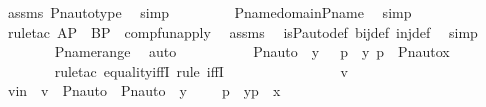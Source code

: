 \begin{isabellebody}
\ assms\ Pn{\isacharunderscore}{\kern0pt}auto{\isacharunderscore}{\kern0pt}type\ \isamarkupfalse%
\ simp\ \isanewline
\ \ \ \ \ \ \isamarkupfalse%
\ P{\isacharunderscore}{\kern0pt}name{\isacharunderscore}{\kern0pt}domain{\isacharunderscore}{\kern0pt}P{\isacharunderscore}{\kern0pt}name\ \isamarkupfalse%
\ simp\ \isanewline
\ \ \ \ \ \ \isamarkupfalse%
\ {\isacharparenleft}{\kern0pt}rule{\isacharunderscore}{\kern0pt}tac\ A{\isacharequal}{\kern0pt}P\ \ B{\isacharequal}{\kern0pt}P\ \ comp{\isacharunderscore}{\kern0pt}fun{\isacharunderscore}{\kern0pt}apply{\isacharparenright}{\kern0pt}\ \isamarkupfalse%
\ assms\ \isamarkupfalse%
\ is{\isacharunderscore}{\kern0pt}P{\isacharunderscore}{\kern0pt}auto{\isacharunderscore}{\kern0pt}def\ bij{\isacharunderscore}{\kern0pt}def\ inj{\isacharunderscore}{\kern0pt}def\ \isamarkupfalse%
\ simp\ \isanewline
\ \ \ \ \ \ \isamarkupfalse%
\ P{\isacharunderscore}{\kern0pt}name{\isacharunderscore}{\kern0pt}range\ \isamarkupfalse%
\ auto\isanewline
\ \ \ \ \isamarkupfalse%
\ \isamarkupfalse%
\ {\isachardoublequoteopen}{\isachardot}{\kern0pt}{\isachardot}{\kern0pt}{\isachardot}{\kern0pt}\ {\isacharequal}{\kern0pt}\ {\isacharbraceleft}{\kern0pt}\ {\isacharless}{\kern0pt}Pn{\isacharunderscore}{\kern0pt}auto{\isacharparenleft}{\kern0pt}{\isasympi}{\isacharparenright}{\kern0pt}\ {\isacharbackquote}{\kern0pt}\ y{\isacharprime}{\kern0pt}{\isacharcomma}{\kern0pt}\ {\isasympi}\ {\isacharbackquote}{\kern0pt}\ p{\isacharprime}{\kern0pt}{\isachargreater}{\kern0pt}\ {\isachardot}{\kern0pt}\ {\isacharless}{\kern0pt}y{\isacharprime}{\kern0pt}{\isacharcomma}{\kern0pt}\ p{\isacharprime}{\kern0pt}{\isachargreater}{\kern0pt}\ {\isasymin}\ Pn{\isacharunderscore}{\kern0pt}auto{\isacharparenleft}{\kern0pt}{\isasymtau}{\isacharparenright}{\kern0pt}{\isacharbackquote}{\kern0pt}x\ {\isacharbraceright}{\kern0pt}{\isachardoublequoteclose}\ \isanewline
\ \ \ \ \ \ \isamarkupfalse%
\ {\isacharparenleft}{\kern0pt}rule{\isacharunderscore}{\kern0pt}tac\ equality{\isacharunderscore}{\kern0pt}iffI{\isacharsemicolon}{\kern0pt}\ rule\ iffI{\isacharparenright}{\kern0pt}\ \isanewline
\ \ \ \ \isamarkupfalse%
\ {\isacharminus}{\kern0pt}\ \isanewline
\ \ \ \ \ \ \isamarkupfalse%
\ v\ \isamarkupfalse%
\ vin\ {\isacharcolon}{\kern0pt}\ {\isachardoublequoteopen}v\ {\isasymin}\ {\isacharbraceleft}{\kern0pt}{\isasymlangle}Pn{\isacharunderscore}{\kern0pt}auto{\isacharparenleft}{\kern0pt}{\isasympi}{\isacharparenright}{\kern0pt}\ {\isacharbackquote}{\kern0pt}\ {\isacharparenleft}{\kern0pt}Pn{\isacharunderscore}{\kern0pt}auto{\isacharparenleft}{\kern0pt}{\isasymtau}{\isacharparenright}{\kern0pt}\ {\isacharbackquote}{\kern0pt}\ y{\isacharparenright}{\kern0pt}{\isacharcomma}{\kern0pt}\ {\isasympi}\ {\isacharbackquote}{\kern0pt}\ {\isacharparenleft}{\kern0pt}{\isasymtau}\ {\isacharbackquote}{\kern0pt}\ p{\isacharparenright}{\kern0pt}{\isasymrangle}\ {\isachardot}{\kern0pt}\ {\isasymlangle}y{\isacharcomma}{\kern0pt}p{\isasymrangle}\ {\isasymin}\ x{\isacharbraceright}{\kern0pt}{\isachardoublequoteclose}\isanewline

\end{isabellebody}
